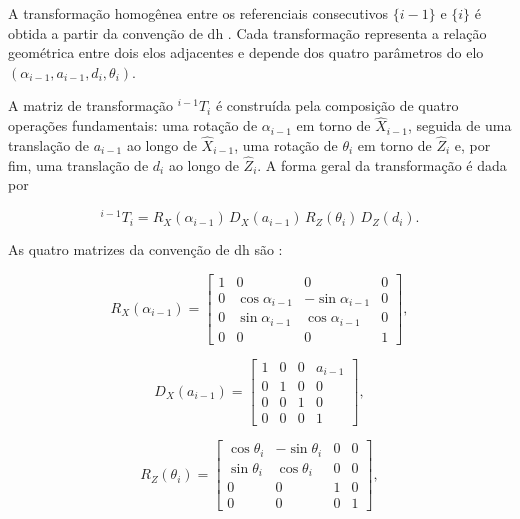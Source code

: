 A transformação homogênea entre os referenciais consecutivos $\{i-1\}$ e $\{i\}$ é obtida a partir da convenção de \gls{dh} \cite{craig2005}.
Cada transformação representa a relação geométrica entre dois elos adjacentes e depende dos quatro parâmetros do elo $(\alpha_{i-1}, a_{i-1}, d_i, \theta_i)$.

A matriz de transformação $^{i-1}T_i$ é construída pela composição de quatro operações fundamentais: uma rotação de $\alpha_{i-1}$ em torno de $\hat{X}_{i-1}$, seguida de uma translação de $a_{i-1}$ ao longo de $\hat{X}_{i-1}$, uma rotação de $\theta_i$ em torno de $\hat{Z}_i$ e, por fim, uma translação de $d_i$ ao longo de $\hat{Z}_i$.
A forma geral da transformação é dada por \cite{craig2005}

\begin{equation}
    {}^{i-1}T_i
    =
    R_X(\alpha_{i-1})\,D_X(a_{i-1})\,R_Z(\theta_i)\,D_Z(d_i).
\end{equation}

As quatro matrizes da convenção de \gls{dh} são \cite{spong2006robot}:

\begin{equation}
R_X(\alpha_{i-1}) =
\begin{bmatrix}
1 & 0 & 0 & 0 \\
0 & \cos\alpha_{i-1} & -\sin\alpha_{i-1} & 0 \\
0 & \sin\alpha_{i-1} &  \cos\alpha_{i-1} & 0 \\
0 & 0 & 0 & 1
\end{bmatrix},
\end{equation}

\begin{equation}
D_X(a_{i-1}) =
\begin{bmatrix}
1 & 0 & 0 & a_{i-1} \\
0 & 1 & 0 & 0 \\
0 & 0 & 1 & 0 \\
0 & 0 & 0 & 1
\end{bmatrix},
\end{equation}

\begin{equation}
R_Z(\theta_i) =
\begin{bmatrix}
\cos\theta_i & -\sin\theta_i & 0 & 0 \\
\sin\theta_i &  \cos\theta_i & 0 & 0 \\
0 & 0 & 1 & 0 \\
0 & 0 & 0 & 1
\end{bmatrix},
\end{equation}

